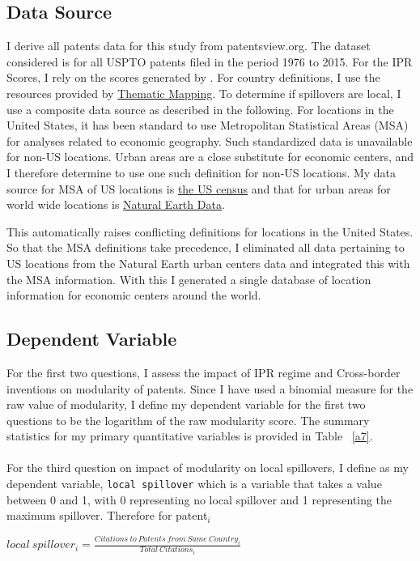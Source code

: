\documentclass[12pt]{article}
\begin{document}
\subsection{Data Source}
I derive all patents data for this study from patentsview.org. The dataset considered is for all USPTO patents filed in the period 1976 to 2015. For the IPR Scores, I rely on the scores generated by \cite{Lesser2010}. For country definitions, I use the resources provided by \href{http://thematicmapping.org/downloads/world_borders.php}{Thematic Mapping}. To determine if spillovers are local, I use a composite data source as described in the following. For locations in the United States, it has been standard to use Metropolitan Statistical Areas (MSA) for analyses related to economic geography. Such standardized data is unavailable for non-US locations. Urban areas are a close substitute for  economic centers, and I therefore determine to use one such definition for non-US locations. My data source for MSA of US locations is \href{http://www.census.gov/geo/maps-data/data/cbf/cbf_msa.html}{the US census} and that for urban areas for world wide locations is \href{http://www.naturalearthdata.com/downloads/10m-cultural-vectors/}{Natural Earth Data}.
 
This automatically raises conflicting definitions for locations in the United States. So that the MSA definitions take precedence, I eliminated all data pertaining to US locations from the Natural Earth urban centers data and integrated this with the MSA information. With this I  generated a single database of location information for economic centers around the world. 

\subsection{Dependent Variable}
For the first two questions, I assess the impact of IPR regime and Cross-border inventions on modularity of patents. Since I have used a binomial measure for the raw value of modularity, I define my dependent variable for the first two questions to be the logarithm of the raw modularity score. The summary statistics for my primary quantitative variables is provided in Table ~\ref{a7}. 
\\\\
For the third question on impact of modularity on local spillovers,  I define as my dependent variable, \verb|local spillover| which is a variable that takes a value between 0 and 1, with 0 representing no local spillover and 1 representing the maximum spillover. Therefore for patent$_i$
\begin{center} $ local\ spillover_i = \frac{Citations\ to\ Patents\ from\ Same\ Country_i}{Total\ Citations_i}$\end{center}

\end{document}
